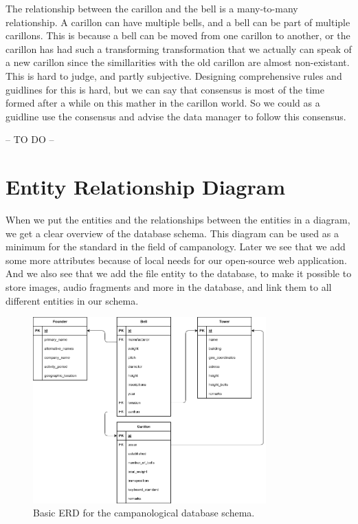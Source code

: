 \documentclass[11pt, a4paper]{article}
\begin{document}
The relationship between the carillon and the bell is a many-to-many relationship. A carillon can have multiple bells, and a bell can be part of multiple carillons. This is because a bell can be moved from one carillon to another, or the carillon has had such a transforming transformation that we actually can speak of a new carillon since the simillarities with the old carillon are almost non-existant. This is hard to judge, and partly subjective. Designing comprehensive rules and guidlines for this is hard, but we can say that consensus is most of the time formed after a while on this mather in the carillon world. So we could as a guidline use the consensus and advise the data manager to follow this consensus.

-- TO DO --

\section{Entity Relationship Diagram}

When we put the entities and the relationships between the entities in a diagram, we get a clear overview of the database schema. This diagram can be used as a minimum for the standard in the field of campanology. Later we see that we add some more attributes because of local needs for our open-source web application. And we also see that we add the file entity to the database, to make it possible to store images, audio fragments and more in the database, and link them to all different entities in our schema.

\clearpage

\begin{figure}[h!]
    \centering
    \includegraphics[width=0.8\textwidth]{images/basic_erd.png}
    \caption{Basic ERD for the campanological database schema.}
    \label{fig:basic-erd}
\end{figure}
\end{document}
